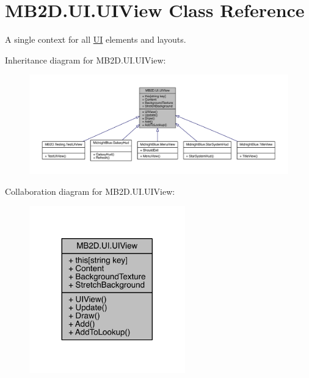 \hypertarget{class_m_b2_d_1_1_u_i_1_1_u_i_view}{}\section{M\+B2\+D.\+U\+I.\+U\+I\+View Class Reference}
\label{class_m_b2_d_1_1_u_i_1_1_u_i_view}


A single context for all \hyperlink{namespace_m_b2_d_1_1_u_i}{UI} elements and layouts.  




Inheritance diagram for M\+B2\+D.\+U\+I.\+U\+I\+View\+:\nopagebreak
\begin{figure}[H]
\begin{center}
\leavevmode
\includegraphics[width=350pt]{class_m_b2_d_1_1_u_i_1_1_u_i_view__inherit__graph}
\end{center}
\end{figure}


Collaboration diagram for M\+B2\+D.\+U\+I.\+U\+I\+View\+:\nopagebreak
\begin{figure}[H]
\begin{center}
\leavevmode
\includegraphics[width=191pt]{class_m_b2_d_1_1_u_i_1_1_u_i_view__coll__graph}
\end{center}
\end{figure}
